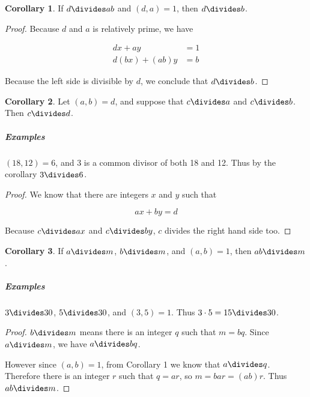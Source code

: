 \documentclass{article}
\theoremstyle{definition} %
\theoremstyle{definition}
\newtheorem{corollary}{Corollary}[section] %
\theoremstyle{definition}
\theoremstyle{definition}
\begin{document}
  \begin{corollary}
    If $d \divides ab$ and $(d, a) = 1$, then $d \divides b$.
    \label{cor:must_divide_one_of_them}
  \end{corollary}
  
  \begin{proof}
    Because $d$ and $a$ is relatively prime, we have
    
    \begin{align*}
      dx + ay &= 1 \\
      d(bx) + (ab)y &= b
    \end{align*}
    
    Because the left side is divisible by $d$, we conclude that $d \divides b$.
  \end{proof}
  
  \begin{corollary}
    Let $(a, b) = d$, and suppose that $c \divides a$ and $c \divides b$.
    Then $c \divides d$.
  \end{corollary}
  
  \subparagraph{Examples} $(18, 12) = 6$, and 3 is a common divisor
  of both 18 and 12. Thus by the corollary $3 \divides 6$.
  
  \begin{proof}
    We know that there are integers $x$ and $y$ such that
    
    \begin{equation*}
      ax + by = d
    \end{equation*}
    
    Because $c \divides ax$ and $c \divides by$, $c$ divides the right hand side too.
  \end{proof}
  
  \begin{corollary}
    If $a \divides m$, $b \divides m$, and $(a, b) = 1$, then $ab \divides m$.
  \end{corollary}
  
  \subparagraph{Examples} $3 \divides 30$, $5 \divides 30$, and $(3, 5) = 1$. Thus $3 \cdot 5 = 15 \divides 30$.
  
  \begin{proof}
    $b \divides m$ means there is an integer $q$ such that $m = bq$.
    Since $a \divides m$, we have $a \divides bq$.
    
    However since $(a, b) = 1$, from Corollary 1 we know that $a \divides q$. Therefore
    there is an integer $r$ such that $q = ar$, so $m = bar = (ab) r$. Thus $ab \divides m$.
  \end{proof}
  
\end{document}

